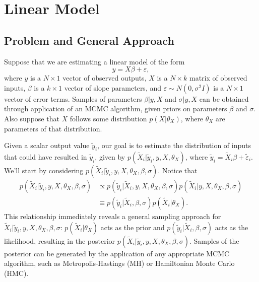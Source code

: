 \documentclass{article}
\newcommand{\ep}{\varepsilon}
\newcommand{\ty}{\tilde{y}_i}
\newcommand{\tX}{\tilde{X}_i}
\begin{document}
\section*{Linear Model}
\subsection*{Problem and General Approach}

Suppose that we are estimating a linear model of the form
\begin{equation}
	\label{eq:lm}
	y = X \beta + \ep,
\end{equation}
where $y$ is a $N\times 1$ vector of observed outputs, $X$ is a $N\times k$ matrix of observed inputs, $\beta$ is a $k\times 1$ vector of slope parameters, and $\ep\sim N(0, \sigma^2 I)$ is a $N\times 1$ vector of error terms. Samples of parameters $\beta | y, X$ and $\sigma | y, X$ can be obtained through application of an MCMC algorithm, given priors on parameters $\beta$ and $\sigma$. Also suppose that $X$ follows some distribution $p(X | \theta_X)$, where $\theta_X$ are parameters of that distribution.

Given a scalar output value $\ty$, our goal is to estimate the distribution of inputs that could have resulted in $\ty$, given by $p(\tX | \ty, y, X, \theta_X)$, where $\ty = \tX \beta + \tilde{\ep}_i$. We'll start by considering $p(\tX | \ty, y, X, \theta_X, \beta, \sigma)$. Notice that
\begin{align}
	\label{eq:conditional-posterior}
	\nonumber
	p(\tX | \ty, y, X, \theta_X, \beta, \sigma) &\propto p(\ty | \tX, y, X, \theta_X, \beta, \sigma) p(\tX | y, X, \theta_X, \beta, \sigma) \\
	&\equiv p(\ty | \tX, \beta, \sigma) p(\tX | \theta_X).
\end{align}
This relationship immediately reveals a general sampling approach for $\tX | \ty, y, X, \theta_X, \beta, \sigma$: $p(\tX | \theta_X)$ acts as the prior and $p(\ty | \tX, \beta, \sigma)$ acts as the likelihood, resulting in the posterior $p(\tX | \ty, y, X, \theta_X, \beta, \sigma)$. Samples of the posterior can be generated by the application of any appropriate MCMC algorithm, such as Metropolis-Hastings (MH) or Hamiltonian Monte Carlo (HMC).
\end{document}
